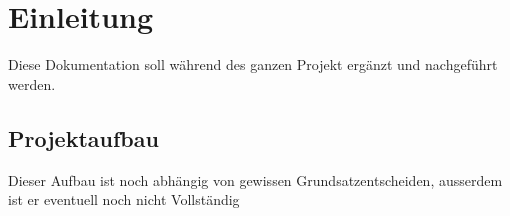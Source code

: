 \chapter{Einleitung}

Diese Dokumentation soll während des ganzen Projekt ergänzt und nachgeführt werden.


\section{Projektaufbau}

Dieser Aufbau ist noch abhängig von gewissen Grundsatzentscheiden, ausserdem ist er eventuell noch nicht Vollständig 
